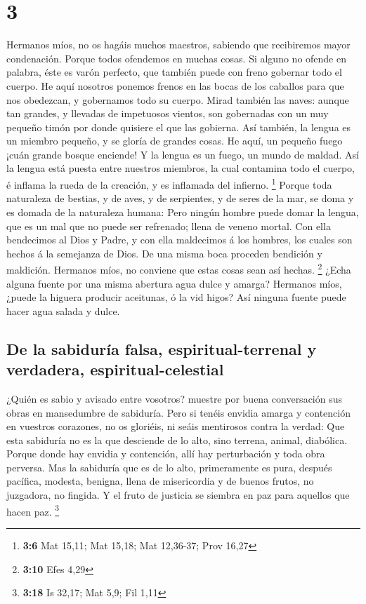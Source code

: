 \hypertarget{section-2}{%
\section{3}\label{section-2}}

 Hermanos míos, no os hagáis muchos maestros, sabiendo que
recibiremos mayor condenación.  Porque todos ofendemos en
muchas cosas. Si alguno no ofende en palabra, éste es varón perfecto,
que también puede con freno gobernar todo el cuerpo.  He
aquí nosotros ponemos frenos en las bocas de los caballos para que nos
obedezcan, y gobernamos todo su cuerpo.  Mirad también las
naves: aunque tan grandes, y llevadas de impetuosos vientos, son
gobernadas con un muy pequeño timón por donde quisiere el que las
gobierna.  Así también, la lengua es un miembro pequeño, y
se gloría de grandes cosas. He aquí, un pequeño fuego ¡cuán grande
bosque enciende!  Y la lengua es un fuego, un mundo de
maldad. Así la lengua está puesta entre nuestros miembros, la cual
contamina todo el cuerpo, é inflama la rueda de la creación, y es
inflamada del infierno. \footnote{\textbf{3:6} Mat 15,11; Mat 15,18; Mat
  12,36-37; Prov 16,27}  Porque toda naturaleza de
bestias, y de aves, y de serpientes, y de seres de la mar, se doma y es
domada de la naturaleza humana:  Pero ningún hombre puede
domar la lengua, que es un mal que no puede ser refrenado; llena de
veneno mortal.  Con ella bendecimos al Dios y Padre, y con
ella maldecimos á los hombres, los cuales son hechos á la semejanza de
Dios.  De una misma boca proceden bendición y maldición.
Hermanos míos, no conviene que estas cosas sean así hechas. \footnote{\textbf{3:10}
  Efes 4,29}  ¿Echa alguna fuente por una misma abertura
agua dulce y amarga?  Hermanos míos, ¿puede la higuera
producir aceitunas, ó la vid higos? Así ninguna fuente puede hacer agua
salada y dulce.

\hypertarget{de-la-sabiduruxeda-falsa-espiritual-terrenal-y-verdadera-espiritual-celestial}{%
\subsection{De la sabiduría falsa, espiritual-terrenal y verdadera,
espiritual-celestial}\label{de-la-sabiduruxeda-falsa-espiritual-terrenal-y-verdadera-espiritual-celestial}}

 ¿Quién es sabio y avisado entre vosotros? muestre por
buena conversación sus obras en mansedumbre de sabiduría.
 Pero si tenéis envidia amarga y contención en vuestros
corazones, no os gloriéis, ni seáis mentirosos contra la verdad:
 Que esta sabiduría no es la que desciende de lo alto,
sino terrena, animal, diabólica.  Porque donde hay
envidia y contención, allí hay perturbación y toda obra perversa.
 Mas la sabiduría que es de lo alto, primeramente es
pura, después pacífica, modesta, benigna, llena de misericordia y de
buenos frutos, no juzgadora, no fingida.  Y el fruto de
justicia se siembra en paz para aquellos que hacen paz. \footnote{\textbf{3:18}
  Is 32,17; Mat 5,9; Fil 1,11}

